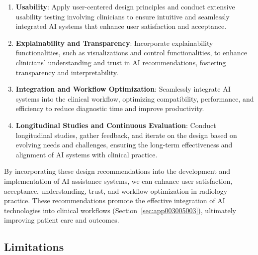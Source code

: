 \begin{enumerate}

\item \textbf{Usability}:
Apply user-centered design principles and conduct extensive usability testing involving clinicians to ensure intuitive and seamlessly integrated \ac{AI} systems that enhance user satisfaction and acceptance.

\vspace{0.025mm}

\item \textbf{Explainability and Transparency}:
Incorporate explainability functionalities, such as visualizations and control functionalities, to enhance clinicians' understanding and trust in \ac{AI} recommendations, fostering transparency and interpretability.

\vspace{0.025mm}

\item \textbf{Integration and Workflow Optimization}:
Seamlessly integrate \ac{AI} systems into the clinical workflow, optimizing compatibility, performance, and efficiency to reduce diagnostic time and improve productivity.

\vspace{0.05mm}

\item \textbf{Longitudinal Studies and Continuous Evaluation}:
Conduct longitudinal studies, gather feedback, and iterate on the design based on evolving needs and challenges, ensuring the long-term effectiveness and alignment of \ac{AI} systems with clinical practice.

\end{enumerate}

\vspace{0.05mm}

By incorporating these design recommendations into the development and implementation of \ac{AI} assistance systems, we can enhance user satisfaction, acceptance, understanding, trust, and workflow optimization in radiology practice.
These recommendations promote the effective integration of \ac{AI} technologies into clinical workflows (Section~\ref{sec:app003005003}), ultimately improving patient care and outcomes.

\subsection{Limitations}
\label{sec:chap005007004}

